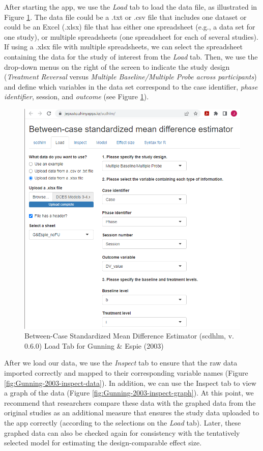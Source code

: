 \documentclass[
]{book}
\begin{document}
After starting the app, we use the \emph{Load} tab to load the data file, as illustrated in Figure \ref{fig:Gunning-2003-load}.
The data file could be a .txt or .csv file that includes one dataset or could be an Excel (.xlsx) file that has either one spreadsheet (e.g., a data set for one study), or multiple spreadsheets (one spreadsheet for each of several studies). If using a .xlsx file with multiple spreadsheets, we can select the spreadsheet containing the data for the study of interest from the \emph{Load} tab. Then, we use the drop-down menus on the right of the screen to indicate the study design (\emph{Treatment Reversal} versus \emph{Multiple Baseline/Multiple Probe across participants}) and define which variables in the data set correspond to the case identifier, \emph{phase identifier}, session, and \emph{outcome} (see Figure \ref{fig:Gunning-2003-load}).

\begin{figure}
\includegraphics[width=0.6\linewidth]{images/app.load_GunningEspie2003} \caption{Between-Case Standardized Mean Difference Estimator (scdhlm, v. 0.6.0) Load Tab for Gunning \& Espie (2003)}\label{fig:Gunning-2003-load}
\end{figure}

After we load our data, we use the \emph{Inspect} tab to ensure that the raw data imported correctly and mapped to their corresponding variable names (Figure \ref{fig:Gunning-2003-inspect-data}). In addition, we can use the Inspect tab to view a graph of the data (Figure \ref{fig:Gunning-2003-inspect-graph}). At this point, we recommend that researchers compare these data with the graphed data from the original studies as an additional measure that ensures the study data uploaded to the app correctly (according to the selections on the \emph{Load} tab). Later, these graphed data can also be checked again for consistency with the tentatively selected model for estimating the design-comparable effect size.
\end{document}
